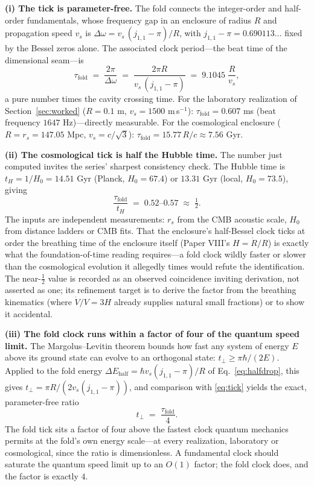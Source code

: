 \documentclass[11pt]{article}
\theoremstyle{remark}
\begin{document}
\textbf{(i) The tick is parameter-free.} The fold connects the integer-order and half-order fundamentals, whose frequency gap in an enclosure of radius $R$ and propagation speed $v_s$ is $\Delta\omega = v_s\,(j_{1,1} - \pi)/R$, with $j_{1,1} - \pi = 0.690113\ldots$ fixed by the Bessel zeros alone. The associated clock period---the beat time of the dimensional seam---is
\begin{equation}
\tau_{\mathrm{fold}} \;=\; \frac{2\pi}{\Delta\omega} \;=\; \frac{2\pi R}{v_s\,(j_{1,1} - \pi)} \;=\; 9.1045\;\frac{R}{v_s},
\label{eq:tick}
\end{equation}
a pure number times the cavity crossing time. For the laboratory realization of Section~\ref{sec:worked} ($R = 0.1$ m, $v_s = 1500$ m\,s$^{-1}$): $\tau_{\mathrm{fold}} = 0.607$ ms (beat frequency $1647$ Hz)---directly measurable. For the cosmological enclosure ($R = r_s = 147.05$ Mpc, $v_s = c/\sqrt{3}$): $\tau_{\mathrm{fold}} = 15.77\, R/c \approx 7.56$ Gyr.

\textbf{(ii) The cosmological tick is half the Hubble time.} The number just computed invites the series' sharpest consistency check. The Hubble time is $t_H = 1/H_0 = 14.51$ Gyr (Planck, $H_0 = 67.4$) or $13.31$ Gyr (local, $H_0 = 73.5$), giving
\begin{equation}
\frac{\tau_{\mathrm{fold}}}{t_H} \;=\; 0.52\text{--}0.57 \;\approx\; \tfrac{1}{2}.
\label{eq:halfhubble}
\end{equation}
The inputs are independent measurements: $r_s$ from the CMB acoustic scale, $H_0$ from distance ladders or CMB fits. That the enclosure's half-Bessel clock ticks at order the breathing time of the enclosure itself (Paper VIII's $H = \dot{R}/R$) is exactly what the foundation-of-time reading requires---a fold clock wildly faster or slower than the cosmological evolution it allegedly times would refute the identification. The near-$\tfrac{1}{2}$ value is recorded as an observed coincidence inviting derivation, not asserted as one; its refinement target is to derive the factor from the breathing kinematics (where $\dot{V}/V = 3H$ already supplies natural small fractions) or to show it accidental.

\textbf{(iii) The fold clock runs within a factor of four of the quantum speed limit.} The Margolus--Levitin theorem bounds how fast any system of energy $E$ above its ground state can evolve to an orthogonal state: $t_\perp \geq \pi\hbar/(2E)$. Applied to the fold energy $\Delta E_{\mathrm{half}} = \hbar v_s (j_{1,1} - \pi)/R$ of Eq.~\eqref{eq:halfdrop}, this gives $t_\perp = \pi R/(2 v_s (j_{1,1} - \pi))$, and comparison with \eqref{eq:tick} yields the exact, parameter-free ratio
\begin{equation}
t_\perp \;=\; \frac{\tau_{\mathrm{fold}}}{4}.
\label{eq:qsl}
\end{equation}
The fold tick sits a factor of four above the fastest clock quantum mechanics permits at the fold's own energy scale---at every realization, laboratory or cosmological, since the ratio is dimensionless. A fundamental clock should saturate the quantum speed limit up to an $O(1)$ factor; the fold clock does, and the factor is exactly $4$.
\end{document}
